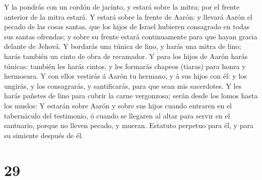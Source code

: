  Y la pondrás con un cordón de jacinto, y estará sobre la
mitra; por el frente anterior de la mitra estará.  Y
estará sobre la frente de Aarón: y llevará Aarón el pecado de las cosas
santas, que los hijos de Israel hubieren consagrado en todas sus santas
ofrendas; y sobre su frente estará continuamente para que hayan gracia
delante de Jehová.  Y bordarás una túnica de lino, y
harás una mitra de lino; harás también un cinto de obra de recamador.
 Y para los hijos de Aarón harás túnicas; también les
harás cintos, y les formarás chapeos (tiaras) para honra y hermosura.
 Y con ellos vestirás á Aarón tu hermano, y á sus hijos
con él: y los ungirás, y los consagrarás, y santificarás, para que sean
mis sacerdotes.  Y les harás pañetes de lino para cubrir
la carne vergonzosa; serán desde los lomos hasta los muslos:
 Y estarán sobre Aarón y sobre sus hijos cuando entraren
en el tabernáculo del testimonio, ó cuando se llegaren al altar para
servir en el santuario, porque no lleven pecado, y mueran. Estatuto
perpetuo para él, y para su simiente después de él.

\hypertarget{section-28}{%
\section{29}\label{section-28}}

